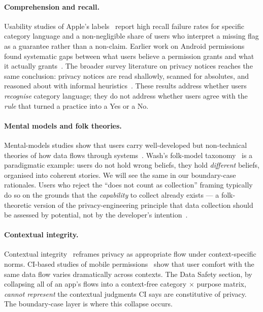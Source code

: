 \documentclass[11pt,a4paper]{article}
\begin{document}
\paragraph{Comprehension and recall.}
Usability studies of Apple's labels~\citep{zhang:etal:2022} report
high recall failure rates for specific category language and a
non-negligible share of users who interpret a missing flag as a
guarantee rather than a non-claim. Earlier work on Android
permissions found systematic gaps between what users believe a
permission grants and what it actually grants~\citep{felt:etal:2012,
felt:etal:2012b,liccardi:etal:2014,tan:etal:2014,
wijesekera:etal:2015,wijesekera:etal:2017}. The broader survey
literature on privacy notices reaches the same conclusion: privacy
notices are read shallowly, scanned for absolutes, and reasoned about
with informal heuristics~\citep{jensen:potts:2004,acquisti:etal:2015,
acquisti:etal:2017,adjerid:etal:2013,good:etal:2007,
acquisti:grossklags:2005,brandimarte:etal:2013}. These results
address whether users \emph{recognise} category language; they do not
address whether users agree with the \emph{rule} that turned a
practice into a Yes or a No.

\paragraph{Mental models and folk theories.}
Mental-models studies show that users carry well-developed but
non-technical theories of how data flows through systems~\citep{
wash:2010,wash:rader:2015,kang:etal:2015,lin:etal:2012,
lin:etal:2014,rader:etal:2012,sannon:etal:2018}. Wash's folk-model
taxonomy~\citep{wash:2010} is a paradigmatic example: users do not
hold wrong beliefs, they hold \emph{different} beliefs, organised
into coherent stories. We will see the same in our boundary-case
rationales. Users who reject the ``does not count as collection''
framing typically do so on the grounds that the \emph{capability} to
collect already exists --- a folk-theoretic version of the
privacy-engineering principle that data collection should be assessed
by potential, not by the developer's
intention~\citep{spiekermann:cranor:2009,cavoukian:2009}.

\paragraph{Contextual integrity.}
Contextual integrity~\citep{nissenbaum:2004,nissenbaum:2010,
barth:etal:2006,martin:nissenbaum:2017,apthorpe:etal:2018,
shvartzshnaider:etal:2019} reframes privacy as appropriate flow under
context-specific norms. CI-based studies of mobile
permissions~\citep{wijesekera:etal:2015,wijesekera:etal:2017,
naeini:etal:2017} show that user comfort with the same data flow
varies dramatically across contexts. The Data Safety section, by
collapsing all of an app's flows into a context-free category $\times$
purpose matrix, \emph{cannot represent} the contextual judgments CI
says are constitutive of privacy. The boundary-case layer is where
this collapse occurs.
\end{document}
